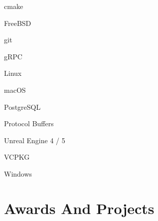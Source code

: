 \documentclass[a4paper]{deedy-resume} %
\begin{document}
\begin{minipage}[t]{0.33\textwidth}
	\begin{tightitemize}
		\item cmake \\
		\item FreeBSD \\
		\item git \\
		\item gRPC \\
		\item Linux \\
		\item macOS \\
		\item PostgreSQL \\
		\item Protocol Buffers \\
		\item Unreal Engine 4 / 5 \\
		\item VCPKG \\
		\item Windows \\
	\end{tightitemize}


\end{minipage}%
\hfill%





\vfill %

\noindent\makebox[\linewidth]{\color{headings}\rule{\paperwidth}{0.4pt}}


\section{Awards And Projects}
\end{document}

